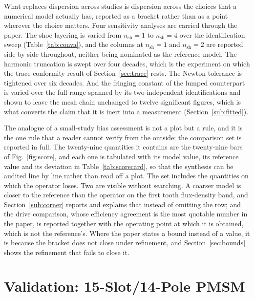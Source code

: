 \documentclass[10pt,a4paper,twocolumn]{article}
\theoremstyle{plain}
\theoremstyle{remark}
\begin{document}
What replaces dispersion across studies is dispersion across the
choices that a numerical model actually has, reported as a bracket
rather than as a point wherever the choice matters. Four sensitivity
analyses are carried through the paper. The shoe layering is varied from
$n_{\mathrm{sh}}=1$ to $n_{\mathrm{sh}}=4$ over the identification sweep
(Table~\ref{tab:conva}), and the columns at $n_{\mathrm{sh}}=1$ and
$n_{\mathrm{sh}}=2$ are reported side by side throughout, neither being
nominated as the reference model. The harmonic truncation is swept over four
decades, which is the experiment on which the trace-conformity result of
Section~\ref{sec:trace} rests. The Newton tolerance is tightened over
six decades. And the fringing constant of the lumped counterpart is
varied over the full range spanned by its two independent
identifications and shown to leave the mesh chain unchanged to twelve
significant figures, which is what converts the claim that it is inert
into a measurement (Section~\ref{sub:fitted}).

The analogue of a small-study bias assessment is not a plot but a rule,
and it is the one rule that a reader cannot verify from the outside: the
comparison set is reported in full. The twenty-nine quantities it
contains are the twenty-nine bars of Fig.~\ref{fig:score}, and each one
is tabulated with its model value, its reference value and its deviation
in Table~\ref{tab:scorecard}, so that the synthesis can be audited
line by line rather than read off a plot. The set includes the
quantities on which the operator loses. Two are
visible without searching. A coarser model is closer to the reference
than the operator on the first tooth flux-density band, and
Section~\ref{sub:corner} reports and explains that instead of omitting
the row; and the drive comparison, whose efficiency agreement is the
most quotable number in the paper, is reported together with the
operating point at which it is obtained, which is not the reference's.
Where the paper states a bound instead of a value, it is because the
bracket does not close under refinement, and Section~\ref{sec:bounds}
shows the refinement that fails to close it.



\section{Validation: 15-Slot/14-Pole PMSM}
\label{sec:pmsm}
\end{document}
